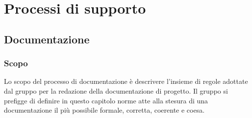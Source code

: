 \documentclass[../NormediProgetto.tex]{subfiles}
\begin{document}

\chapter{Processi di supporto}


\section{Documentazione}

\subsection{Scopo} 

Lo scopo del processo di documentazione è descrivere l'insieme di regole adottate dal gruppo per la redazione della documentazione di progetto. Il gruppo si prefigge di definire in questo capitolo norme atte alla stesura di una documentazione il più possibile formale, corretta, coerente e coesa.
\end{document}
